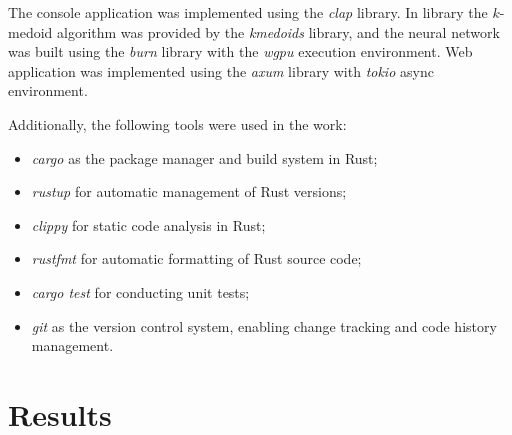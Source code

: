 \documentclass[pdflatex,sn-vancouver-num]{sn-jnl}%
\begin{document}
            The console application was implemented using the \textit{clap} library\cite{Rust:clap}. In library the $k$-medoid algorithm was provided by the \textit{kmedoids} library\cite{Rust:kmedoids}, and the neural network was built using the \textit{burn} library\cite{Rust:burn} with the \textit{wgpu} execution environment. Web application was implemented using the \textit{axum} library\cite{Rust:axum} with \textit{tokio}\cite{Rust:axum} async environment.

            Additionally, the following tools were used in the work:
            \begin{itemize}
                \item \textit{cargo} as the package manager and build system in Rust;
                \item \textit{rustup} for automatic management of Rust versions;
                \item \textit{clippy} for static code analysis in Rust;
                \item \textit{rustfmt} for automatic formatting of Rust source code;
                \item \textit{cargo test} for conducting unit tests;
                \item \textit{git} as the version control system, enabling change tracking and code history management.
            \end{itemize}


                \section{Results}



\end{document}
